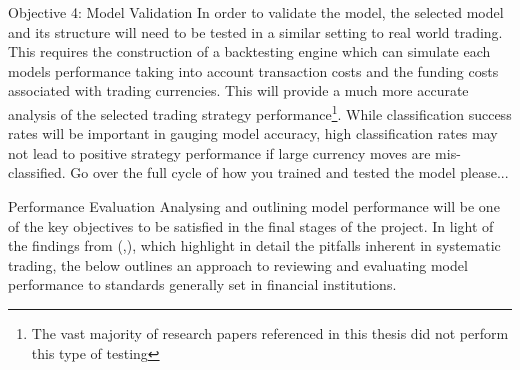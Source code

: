 \documentclass[11pt]{article}
\begin{document}
 
Objective 4: Model Validation
In order to validate the model, the selected model and its structure will need to be tested in a similar setting to real world trading. This requires the construction of a backtesting engine which can simulate each models performance taking into account transaction costs and the funding costs associated with trading currencies.
This will provide a much more accurate analysis of the selected trading strategy performance\footnote{The vast majority of research papers referenced in this thesis did not perform this type of testing}. While classification success rates will be important in gauging model accuracy, high classification rates may not lead to positive strategy performance if large currency moves are mis-classified.
Go over the full cycle of how you trained and tested the model please...



Performance Evaluation
Analysing and outlining model performance will be one of the key objectives to be satisfied in the final stages of the project.
In light of the findings from (\cite{Arnott2018},\cite{Bailey2013}), which highlight in detail the pitfalls inherent in systematic trading, the below outlines an approach to reviewing and evaluating model performance to standards generally set in financial institutions.
\end{document}
